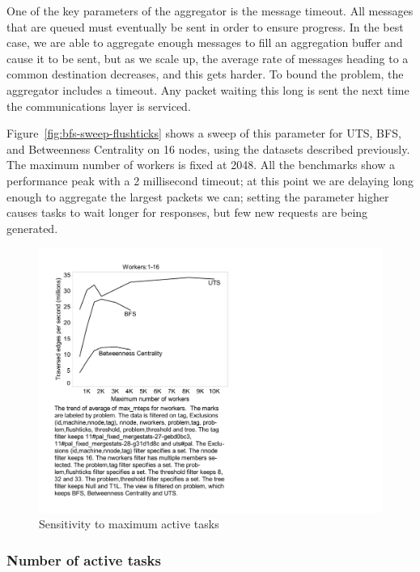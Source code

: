 One of the key parameters of the aggregator is the message
timeout. All messages that are queued must eventually be sent in order
to ensure progress. In the best case, we are able to aggregate enough
messages to fill an aggregation buffer and cause it to be sent, but as
we scale up, the average rate of messages heading to a common
destination decreases, and this gets harder. To bound the problem, the
aggregator includes a timeout. Any packet waiting this long is sent
the next time the communications layer is serviced.

Figure~\ref{fig:bfs-sweep-flushticks} shows a sweep of this parameter
for UTS, BFS, and Betweenness Centrality on 16 nodes, using the
datasets described previously. The maximum number of workers is fixed
at 2048. All the benchmarks show a performance peak with a 2
millisecond timeout; at this point we are delaying long enough to
aggregate the largest packets we can; setting the parameter higher
causes tasks to wait longer for responses, but few new requests are
being generated.


\begin{figure}[htb]
\begin{center}
  \includegraphics[width=0.95\columnwidth]{figs/worker_sweep}
\begin{minipage}{0.95\columnwidth} 
  \caption{\label{fig:bfs-sweep-workers} Sensitivity to maximum active tasks}
\end{minipage}
\vspace{-3ex}
\end{center}
\end{figure}

\subsubsection{Number of active tasks} 

